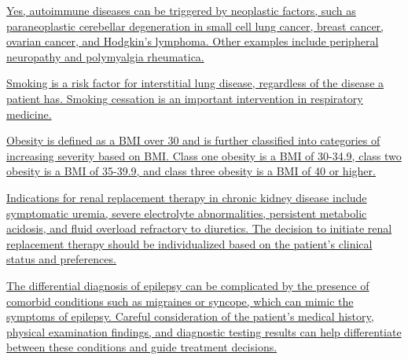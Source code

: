 \documentclass[10pt, a4paper]{article}
\begin{document}
\begin{multicols}{2}
\begin{enumerate}
\parbox{\linewidth}{\item \href{https://www.notion.so/Introduction-to-Inflammatory-Diseases-468a2e5ebf9345f0922b71a9aa3a5ed2}{ Yes, autoimmune diseases can be triggered by neoplastic factors, such as paraneoplastic cerebellar degeneration in small cell lung cancer, breast cancer, ovarian cancer, and Hodgkin's lymphoma. Other examples include peripheral neuropathy and polymyalgia rheumatica.}} 

 \vspace{6pt} 

\parbox{\linewidth}{\item \href{https://www.notion.so/Interstitial-Lung-Disease-084cb0233f4b4ecaa47c7d4e5e643e01}{ Smoking is a risk factor for interstitial lung disease, regardless of the disease a patient has. Smoking cessation is an important intervention in respiratory medicine.}} 

 \vspace{6pt} 

\parbox{\linewidth}{\item \href{https://www.notion.so/Introduction-to-bariatric-syndromes-bd7faa5f432a4dbfaad7215533604702}{ Obesity is defined as a BMI over 30 and is further classified into categories of increasing severity based on BMI. Class one obesity is a BMI of 30-34.9, class two obesity is a BMI of 35-39.9, and class three obesity is a BMI of 40 or higher.}} 

 \vspace{6pt} 

\parbox{\linewidth}{\item \href{https://www.notion.so/Clinical-Pathology-Chronic-Kidney-Disease-60fba6f300a94462bae85f347433d15b}{ Indications for renal replacement therapy in chronic kidney disease include symptomatic uremia, severe electrolyte abnormalities, persistent metabolic acidosis, and fluid overload refractory to diuretics. The decision to initiate renal replacement therapy should be individualized based on the patient's clinical status and preferences.}} 

 \vspace{6pt} 

\parbox{\linewidth}{\item \href{https://www.notion.so/Epilepsy-885811c6268d4c05b5dacd9541850a0f}{ The differential diagnosis of epilepsy can be complicated by the presence of comorbid conditions such as migraines or syncope, which can mimic the symptoms of epilepsy. Careful consideration of the patient's medical history, physical examination findings, and diagnostic testing results can help differentiate between these conditions and guide treatment decisions.}} 


\end{enumerate}
\end{multicols}
\end{document}
